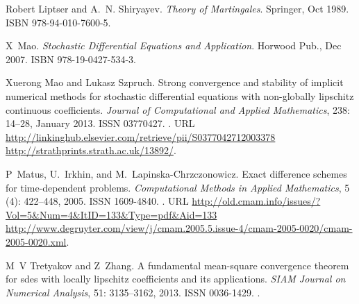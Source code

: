 \documentclass[3p]{elsarticle}
\theoremstyle{definition}
\theoremstyle{plain}%
\theoremstyle{remark}
\begin{document}
\begin{thebibliography}{17}
Robert Liptser and A.~N. Shiryayev.
\newblock \emph{Theory of Martingales}.
\newblock Springer, Oct 1989.
\newblock ISBN 978-94-010-7600-5.

X~Mao.
\newblock \emph{Stochastic Differential Equations and Application}.
\newblock Horwood Pub., Dec 2007.
\newblock ISBN 978-19-0427-534-3.

Xuerong Mao and Lukasz Szpruch.
\newblock Strong convergence and stability of implicit numerical methods for
  stochastic differential equations with non-globally lipschitz continuous
  coefficients.
\newblock \emph{Journal of Computational and Applied Mathematics},
  238: 14--28, January 2013.
\newblock ISSN 03770427.
\newblock {}.
\newblock URL
  \url{http://linkinghub.elsevier.com/retrieve/pii/S0377042712003378
  http://strathprints.strath.ac.uk/13892/}.

P~Matus, U.~Irkhin, and M.~Lapinska-Chrzczonowicz.
\newblock Exact difference schemes for time-dependent problems.
\newblock \emph{Computational Methods in Applied Mathematics}, 5
  (4): 422--448, 2005.
\newblock ISSN 1609-4840.
\newblock {}.
\newblock URL
  \url{http://old.cmam.info/issues/?Vol=5&Num=4&ItID=133&Type=pdf&Aid=133
  http://www.degruyter.com/view/j/cmam.2005.5.issue-4/cmam-2005-0020/cmam-2005-0020.xml}.

M~V Tretyakov and Z~Zhang.
\newblock A fundamental mean-square convergence theorem for sdes with locally
  lipschitz coefficients and its applications.
\newblock \emph{SIAM Journal on Numerical Analysis}, 51: 3135--3162,
  2013.
\newblock ISSN 0036-1429.
\newblock {}.

\end{thebibliography}
\appendix
\end{document}
